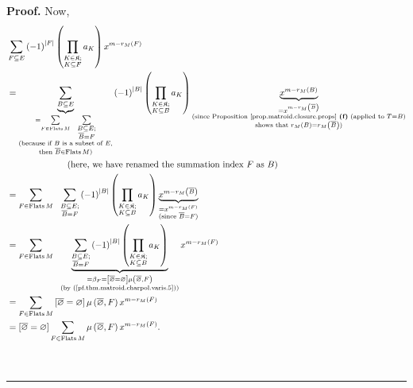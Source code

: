 \documentclass[numbers=enddot,12pt,final,onecolumn,notitlepage]{scrartcl}%
\theoremstyle{definition}
\newenvironment{proof}[1][Proof]{\noindent\textbf{#1.} }{\ \rule{0.5em}{0.5em}}
\let\sumnonlimits\sum
\let\prodnonlimits\prod
\renewcommand{\sum}{\sumnonlimits\limits}
\renewcommand{\prod}{\prodnonlimits\limits}
\begin{document}
\begin{proof}
Now,%
\begin{align}
&  \sum_{F\subseteq E}\left(  -1\right)  ^{\left\vert F\right\vert }\left(
\prod_{\substack{K\in\mathfrak{K};\\K\subseteq F}}a_{K}\right)  x^{m-r_{M}%
\left(  F\right)  }\nonumber\\
&  =\underbrace{\sum_{B\subseteq E}}_{\substack{=\sum_{F\in
\operatorname*{Flats}M}\ \ \sum_{\substack{B\subseteq E;\\\overline{B}%
=F}}\\\text{(because if }B\text{ is a subset of }E\text{,}\\\text{then
}\overline{B}\in\operatorname*{Flats}M\text{)}}}\left(  -1\right)
^{\left\vert B\right\vert }\left(  \prod_{\substack{K\in\mathfrak{K}%
;\\K\subseteq B}}a_{K}\right)  \underbrace{x^{m-r_{M}\left(  B\right)  }%
}_{\substack{=x^{m-r_{M}\left(  \overline{B}\right)  }\\\text{(since
Proposition \ref{prop.matroid.closure.props} \textbf{(f)} (applied to
}T=B\text{)}\\\text{shows that }r_{M}\left(  B\right)  =r_{M}\left(
\overline{B}\right)  \text{)}}}\nonumber\\
&  \ \ \ \ \ \ \ \ \ \ \ \ \ \ \ \ \ \ \ \ \left(  \text{here, we have renamed
the summation index }F\text{ as }B\right) \nonumber\\
&  =\sum_{F\in\operatorname*{Flats}M}\ \ \sum_{\substack{B\subseteq
E;\\\overline{B}=F}}\left(  -1\right)  ^{\left\vert B\right\vert }\left(
\prod_{\substack{K\in\mathfrak{K};\\K\subseteq B}}a_{K}\right)
\underbrace{x^{m-r_{M}\left(  \overline{B}\right)  }}_{\substack{=x^{m-r_{M}%
\left(  F\right)  }\\\text{(since }\overline{B}=F\text{)}}}\nonumber\\
&  =\sum_{F\in\operatorname*{Flats}M}\ \ \underbrace{\sum
_{\substack{B\subseteq E;\\\overline{B}=F}}\left(  -1\right)  ^{\left\vert
B\right\vert }\left(  \prod_{\substack{K\in\mathfrak{K};\\K\subseteq B}%
}a_{K}\right)  }_{\substack{=\beta_{F}=\left[  \overline{\varnothing
}=\varnothing\right]  \mu\left(  \overline{\varnothing},F\right)  \\\text{(by
(\ref{pf.thm.matroid.charpol.varis.5}))}}}x^{m-r_{M}\left(  F\right)
}\nonumber\\
&  =\sum_{F\in\operatorname*{Flats}M}\left[  \overline{\varnothing
}=\varnothing\right]  \mu\left(  \overline{\varnothing},F\right)
x^{m-r_{M}\left(  F\right)  }\nonumber\\
&  =\left[  \overline{\varnothing}=\varnothing\right]  \sum_{F\in
\operatorname*{Flats}M}\mu\left(  \overline{\varnothing},F\right)
x^{m-r_{M}\left(  F\right)  }. \label{pf.thm.matroid.charpol.varis.9}%
\end{align}



\end{proof}
\end{document}
